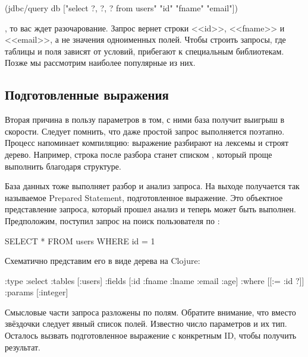\begin{english}
  \begin{clojure}
(jdbc/query db
  ["select ?, ?, ? from users" "id" "fname" "email"])
  \end{clojure}
\end{english}

\noindent
, то вас ждет разочарование. Запрос вернет строки <<id>>, <<fname>> и <<email>>, а не значения одноименных полей. Чтобы строить запросы, где таблицы и поля зависят от условий, прибегают к специальным библиотекам. Позже мы рассмотрим наиболее популярные из них.

\subsection{Подготовленные выражения}

Вторая причина в пользу параметров в том, с ними база получит выигрыш в скорости. Следует помнить, что даже простой запрос выполняется поэтапно. Процесс напоминает компиляцию: выражение разбирают на лексемы и строят дерево. Например, строка  после разбора станет списком , который проще выполнить благодаря структуре.

База данных тоже выполняет разбор и анализ запроса. На выходе получается так называемое Prepared Statement, подготовленное выражение. Это объектное представление запроса, который прошел анализ и теперь может быть выполнен. Предположим, поступил запрос на поиск пользователя по :

\begin{english}
  \begin{sql}
SELECT * FROM users WHERE id = 1
  \end{sql}
\end{english}

Схематично представим его в виде дерева на Clojure:

\begin{english}
  \begin{clojure}
{:type :select
 :tables [:users]
 :fields [:id :fname :lname :email :age]
 :where [[:= :id ?]]
 :params [:integer]}
  \end{clojure}
\end{english}

Смысловые части запроса разложены по полям. Обратите внимание, что вместо звёздочки следует явный список полей. Известно число параметров и их тип. Осталось вызвать подготовленное выражение с конкретным ID, чтобы получить результат.

